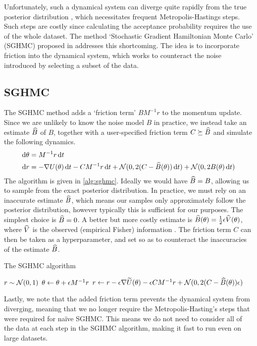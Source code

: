 Unfortunately, such a dynamical system can diverge quite rapidly from the true posterior distribution \cite{neal-hmc}, which necessitates frequent Metropolis-Hastings steps. Such steps are costly since calculating the acceptance probability requires the use of the whole dataset. The method `Stochastic Gradient Hamiltonian Monte Carlo' (SGHMC) proposed in \cite{sghmc} addresses this shortcoming. The idea is to incorporate friction into the dynamical system, which works to counteract the noise introduced by selecting a subset of the data.


\subsection{SGHMC}

The SGHMC method adds a `friction term' $B M^{-1} r$ to the momentum update. Since we are unlikely to know the noise model $B$ in practice, we instead take an estimate $\widehat B$ of $B$, together with a user-specified friction term $C \succeq \widehat B$ and simulate the following dynamics.
\begin{align*}
    \dif\theta &= M^{-1}r \dif t \\
    \dif r &= - \nabla U(\theta) \dif t - CM^{-1}r \dif t + \mc N(0, 2(C - \wh B(\theta))\dif t) + \mc N(0, 2B(\theta) \dif t)
\end{align*}
The algorithm is given in \cref{alg:sghmc}. Ideally we would have $\widehat B = B$, allowing us to sample from the exact posterior distribution. In practice, we must rely on an inaccurate estimate $\widehat B$, which means our samples only approximately follow the posterior distribution, however typically this is sufficient for our purposes. The simplest choice is $\widehat B = 0$. A better but more costly estimate is $\widehat B(\theta) = \frac 1 2 \epsilon \widehat V(\theta)$, where $\widehat V$ is the observed (empirical Fisher) information \cite{sgld-fisher}. The friction term $C$ can then be taken as a hyperparameter, and set so as to counteract the inaccuracies of the estimate $\widehat B$.

\begin{algorithm}
    \caption{The SGHMC algorithm}\label{alg:sghmc}
    \begin{algorithmic}
            \State $r \sim \mathcal N(0,1)$ 
                \State $\theta \gets \theta + \epsilon M^{-1}r$
                \State $r \gets r - \epsilon \nabla \widetilde U(\theta) - \epsilon CM^{-1}r + \mathcal N(0, 2(C- \widehat B(\theta))\epsilon)$
            \EndFor
        \EndFor
    \end{algorithmic}
\end{algorithm}

Lastly, we note that the added friction term prevents the dynamical system from diverging, meaning that we no longer require the Metropolis-Hasting's steps that were required for naïve SGHMC. This means we do not need to consider all of the data at each step in the SGHMC algorithm, making it fast to run even on large datasets.